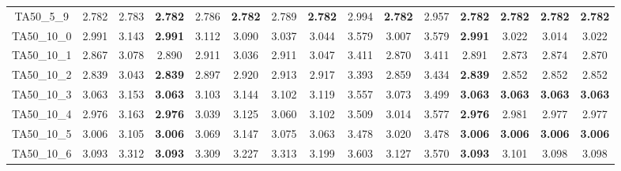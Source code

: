 \begin{tabular}{cc||ccccccccccccc}
TA50\_5\_9         & 2.782            & 2.783            & {\bf 2.782}      & 2.786            & {\bf 2.782}      & 2.789            & {\bf 2.782}      & 2.994            & {\bf 2.782}      & 2.957            & {\bf 2.782}      & {\bf 2.782}      & {\bf 2.782}      & {\bf 2.782}     \\ 
TA50\_10\_0        & 2.991            & 3.143            & {\bf 2.991}      & 3.112            & 3.090            & 3.037            & 3.044            & 3.579            & 3.007            & 3.579            & {\bf 2.991}      & 3.022            & 3.014            & 3.022           \\ 
TA50\_10\_1        & 2.867            & 3.078            & 2.890            & 2.911            & 3.036            & 2.911            & 3.047            & 3.411            & 2.870            & 3.411            & 2.891            & 2.873            & 2.874            & 2.870           \\ 
TA50\_10\_2        & 2.839            & 3.043            & {\bf 2.839}      & 2.897            & 2.920            & 2.913            & 2.917            & 3.393            & 2.859            & 3.434            & {\bf 2.839}      & 2.852            & 2.852            & 2.852           \\ 
TA50\_10\_3        & 3.063            & 3.153            & {\bf 3.063}      & 3.103            & 3.144            & 3.102            & 3.119            & 3.557            & 3.073            & 3.499            & {\bf 3.063}      & {\bf 3.063}      & {\bf 3.063}      & {\bf 3.063}     \\ 
TA50\_10\_4        & 2.976            & 3.163            & {\bf 2.976}      & 3.039            & 3.125            & 3.060            & 3.102            & 3.509            & 3.014            & 3.577            & {\bf 2.976}      & 2.981            & 2.977            & 2.977           \\ 
TA50\_10\_5        & 3.006            & 3.105            & {\bf 3.006}      & 3.069            & 3.147            & 3.075            & 3.063            & 3.478            & 3.020            & 3.478            & {\bf 3.006}      & {\bf 3.006}      & {\bf 3.006}      & {\bf 3.006}     \\ 
TA50\_10\_6        & 3.093            & 3.312            & {\bf 3.093}      & 3.309            & 3.227            & 3.313            & 3.199            & 3.603            & 3.127            & 3.570            & {\bf 3.093}      & 3.101            & 3.098            & 3.098           \\ 

\end{tabular}
